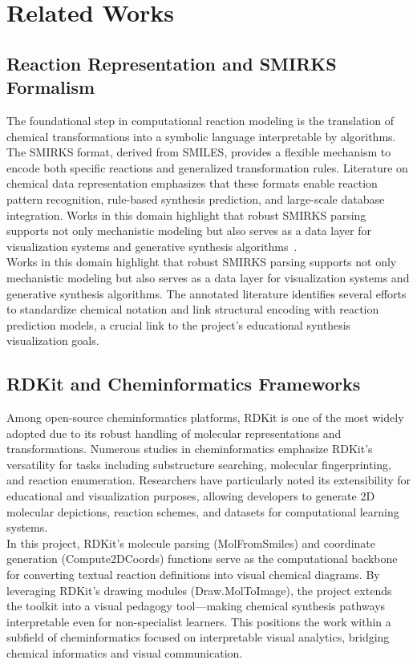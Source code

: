 \documentclass[12pt]{article}
\begin{document}
    
\section{Related Works}
\subsection{Reaction Representation and SMIRKS Formalism}
\indent
The foundational step in computational reaction modeling is the translation of chemical transformations into a symbolic language interpretable by algorithms.
The SMIRKS format, derived from SMILES, provides a flexible mechanism to encode both specific reactions and generalized transformation rules.
Literature on chemical data representation emphasizes that these formats enable reaction pattern recognition, rule-based synthesis prediction, and large-scale database integration.
Works in this domain highlight that robust SMIRKS parsing supports not only mechanistic modeling but also serves as a data layer for visualization systems and generative synthesis algorithms~\cite{10.1002/ail2.91}.
\\
\indent
Works in this domain highlight that robust SMIRKS parsing supports not only mechanistic modeling but also serves as a data layer for visualization systems and generative synthesis algorithms.
The annotated literature identifies several efforts to standardize chemical notation and link structural encoding with reaction prediction models, a crucial link to the project’s educational synthesis visualization goals.
\subsection{RDKit and Cheminformatics Frameworks}
\indent
Among open-source cheminformatics platforms, RDKit is one of the most widely adopted due to its robust handling of molecular representations and transformations. 
Numerous studies in cheminformatics emphasize RDKit’s versatility for tasks including substructure searching, molecular fingerprinting, and reaction enumeration.
Researchers have particularly noted its extensibility for educational and visualization purposes, allowing developers to generate 2D molecular depictions, reaction schemes, and datasets for computational learning systems.
\\
\indent
In this project, RDKit’s molecule parsing (MolFromSmiles) and coordinate generation (Compute2DCoords) functions serve as the computational backbone for converting textual reaction definitions into visual chemical diagrams.
By leveraging RDKit’s drawing modules (Draw.MolToImage), the project extends the toolkit into a visual pedagogy tool—making chemical synthesis pathways interpretable even for non-specialist learners.
This positions the work within a subfield of cheminformatics focused on interpretable visual analytics, bridging chemical informatics and visual communication.
\\
\end{document}
